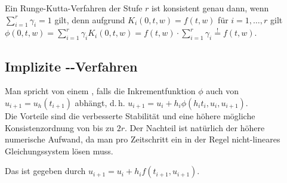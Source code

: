 \begin{Bem}
    Ein Runge-Kutta-Verfahren der Stufe $r$ ist konsistent genau dann, wenn\\
    $\sum_{i=1}^r \gamma_i = 1$ gilt, denn
    aufgrund $K_i(0, t, w) = f(t, w)$ für $i = 1, \dotsc, r$ gilt\\
    $\phi(0, t, w) = \sum_{i=1}^r \gamma_i K_i(0, t, w) =
    f(t, w) \cdot \sum_{i=1}^r \gamma_i \overset{!}{=} f(t, w)$.
\end{Bem}

\subsection{%
    Implizite --Verfahren%
}

\begin{Bem}
    Man spricht von einem ,
    falls die Inkrementfunktion $\phi$ auch von $u_{i+1} = u_h(t_{i+1})$
    abhängt, d.\,h. $u_{i+1} = u_i + h_i \phi(h_i t_i, u_i, u_{i+1})$.\\
    Die Vorteile sind die verbesserte Stabilität und
    eine höhere mögliche Konsistenzordnung von bis zu $2r$.
    Der Nachteil ist natürlich der höhere numerische Aufwand, da man pro
    Zeitschritt ein in der Regel nicht-lineares Gleichungssystem lösen muss.
\end{Bem}

\begin{Bsp}
    Das  ist gegeben durch
    $u_{i+1} = u_i + h_i f(t_{i+1}, u_{i+1})$.
\end{Bsp}

\linie


